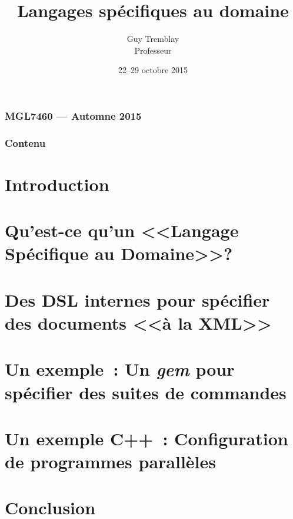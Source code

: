 

\newcommand{\BAC}[1]{#1}
\newcommand{\MAITRISE}[1]{}
\renewcommand{\BAC}[1]{}
\renewcommand{\MAITRISE}{}

\author[Guy Tremblay, D\'epartement d'informatique]
{Guy Tremblay\\Professeur}


\date{22--29 octobre 2015}
\title{Langages sp\'ecifiques au domaine}







\begin{frame}
\frametitle{MGL7460 --- Automne 2015}
\titlepage
\NOTE{\ }
\end{frame}

\begin{frame}
\frametitle{Contenu}
\small
\tableofcontents
\NOTE{\ }
\end{frame}


\section{Introduction}


\section{Qu'est-ce qu'un <<Langage Sp\'ecifique au Domaine>>?}


\section{Des DSL internes pour sp\'ecifier des documents <<\`a la XML>>}



\section{Un exemple~: Un \emph{gem} pour sp\'ecifier des suites de commandes}


\section{Un exemple C++~: Configuration de programmes parall\`eles} 

\section{Conclusion}





